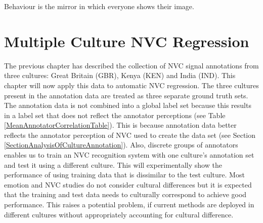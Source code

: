 \begin{savequote}
Behaviour is the mirror in which everyone shows their image.
\end{savequote}


\chapter[Multiple Culture NVC Regression]{Multiple Culture NVC Regression}
\label{ChapterNvcRegression}





The previous chapter has described the collection of \ac{NVC} signal annotations from three cultures: Great Britain (GBR), Kenya (KEN) and India (IND). This chapter will now apply this data to automatic \ac{NVC} regression. The three cultures present in the annotation data are treated as three separate ground truth sets. The annotation data is not combined into a global label set because this results in a label set that does not reflect the annotator perceptions (see Table \ref{MeanAnnotatorCorrelationTable}). This is because \culturallySpecific annotation data better reflects the annotator perception of \ac{NVC} used to create the data set (see Section \ref{SectionAnalysisOfCultureAnnotation}). Also, discrete groups of annotators enables us to train an \ac{NVC} recognition system with one culture's annotation set and test it using a different culture. This will experimentally show the performance of using training data that is dissimilar to the test culture. Most emotion and \ac{NVC} studies do not consider cultural differences but it is expected that the training and test data needs to culturally correspond to achieve good performance. This raises a potential problem, if current methods are deployed in different cultures without appropriately accounting for cultural difference. 

